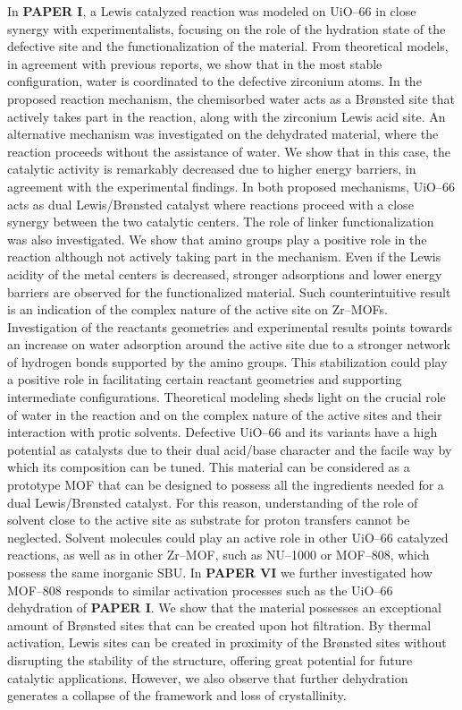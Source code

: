 In \textbf{PAPER I}, a Lewis catalyzed reaction was modeled on UiO--66 in close synergy with experimentalists, focusing on the role of the hydration state of the defective site and the functionalization of the material. From theoretical models, in agreement with previous reports, we show that in the most stable configuration, water is coordinated to the defective zirconium atoms. In the proposed reaction mechanism, the chemisorbed water acts as a Br\o{}nsted site that actively takes part in the reaction, along with the zirconium Lewis acid site. An alternative mechanism was investigated on the dehydrated material, where the reaction proceeds without the assistance of water. We show that in this case, the catalytic activity is remarkably decreased due to higher energy barriers, in agreement with the experimental findings. In both proposed mechanisms, UiO--66 acts as dual Lewis/Br\o{}nsted catalyst where reactions proceed with a close synergy between the two catalytic centers. The role of linker functionalization was also investigated. We show that amino groups play a positive role in the reaction although not actively taking part in the mechanism. Even if the Lewis acidity of the metal centers is decreased, stronger adsorptions and lower energy barriers are observed for the functionalized material. Such counterintuitive result is an indication of the complex nature of the active site on Zr--MOFs. Investigation of the reactants geometries and experimental results points towards an increase on water adsorption around the active site due to a stronger network of hydrogen bonds supported by the amino groups. This stabilization could play a positive role in facilitating certain reactant geometries and supporting intermediate configurations. Theoretical modeling sheds light on the crucial role of water in the reaction and on the complex nature of the active sites and their interaction with protic solvents. Defective UiO--66 and its variants have a high potential as catalysts due to their dual acid/base character and the facile way by which its composition can be tuned. This material can be considered as a prototype MOF that can be designed to possess all the ingredients needed for a dual Lewis/Br\o{}nsted catalyst. For this reason, understanding of the role of solvent close to the active site as substrate for proton transfers cannot be neglected. Solvent molecules could play an active role in other UiO--66 catalyzed reactions, as well as in other Zr--MOF, such as NU--1000 or MOF--808, which possess the same inorganic SBU. 
\npar
In \textbf{PAPER VI} we further investigated how MOF--808 responds to similar activation processes such as the UiO--66 dehydration of \textbf{PAPER I}. We show that the material possesses an exceptional amount of Br\o{}nsted sites that can be created upon hot filtration. By thermal activation, Lewis sites can be created in proximity of the Br\o{}nsted sites without disrupting the stability of the structure, offering great potential for future catalytic applications. However, we also observe that further dehydration generates a collapse of the framework and loss of crystallinity.
